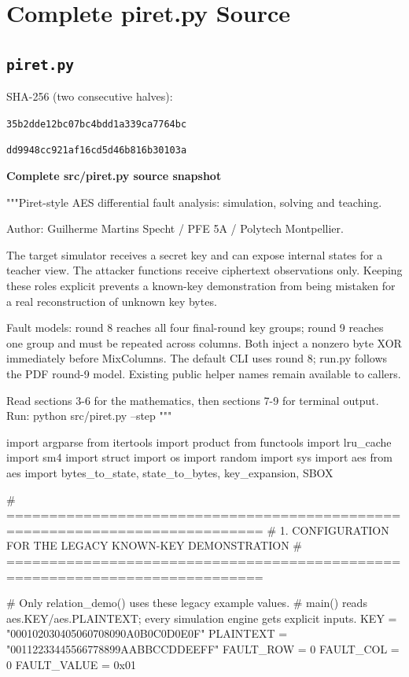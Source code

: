 \ifnum{}\relax\else\appendix\fi
\chapter{Complete piret.py Source}
\section{\texttt{piret.py}}\label{source:piret}
\noindent SHA-256 (two consecutive halves):\par
\texttt{35b2dde12bc07bc4bdd1a339ca7764bc}\par
\texttt{dd9948cc921af16cd5d46b816b30103a}\par
\par\smallskip\noindent\textbf{Complete src/piret.py source snapshot}\par
\begin{lightcode}[numbers=left,firstnumber=1]
"""Piret-style AES differential fault analysis: simulation, solving and teaching.

Author: Guilherme Martins Specht / PFE 5A / Polytech Montpellier.

The target simulator receives a secret key and can expose internal states for a
teacher view. The attacker functions receive ciphertext observations only.
Keeping these roles explicit prevents a known-key demonstration from being
mistaken for a real reconstruction of unknown key bytes.

Fault models: round 8 reaches all four final-round key groups; round 9 reaches
one group and must be repeated across columns. Both inject a nonzero byte XOR
immediately before MixColumns. The default CLI uses round 8; run.py follows the
PDF round-9 model. Existing public helper names remain available to callers.

Read sections 3-6 for the mathematics, then sections 7-9 for terminal output.
Run: python src/piret.py --step
"""


import argparse
from itertools import product
from functools import lru_cache
import sm4
import struct
import os
import random
import sys
import aes
from aes import bytes_to_state, state_to_bytes, key_expansion, SBOX


# ============================================================================
# 1. CONFIGURATION FOR THE LEGACY KNOWN-KEY DEMONSTRATION
# ============================================================================


# Only relation_demo() uses these legacy example values.
# main() reads aes.KEY/aes.PLAINTEXT; every simulation engine gets explicit inputs.
KEY = "000102030405060708090A0B0C0D0E0F"
PLAINTEXT = "00112233445566778899AABBCCDDEEFF"
FAULT_ROW = 0
FAULT_COL = 0
FAULT_VALUE = 0x01



\end{lightcode}
